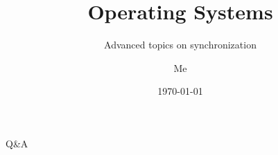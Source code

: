\documentclass[12pt]{beamer}
\title{Operating Systems}
\subtitle{Advanced topics on synchronization}
\author{Me}
\date{\today}
\begin{document}
  \begin{frame}
    \titlepage
  \end{frame}

  
  
  

  \begin{frame}
  \begin{center}
  \Huge Q\&A
  \end{center}
  \end{frame}
\end{document}
